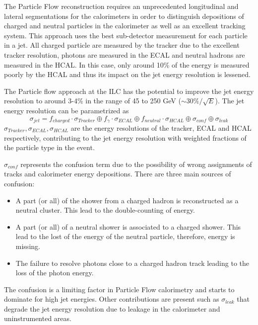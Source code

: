 The Particle Flow reconstruction requires an unprecedented longitudinal and lateral segmentations for the calorimeters in order to distinguish depositions of charged and neutral particles in the calorimeter as well as an excellent tracking system. This approach uses the best sub-detector measurement for each particle in a jet. All charged particle are measured by the tracker due to the excellent tracker resolution, photons are measured in the ECAL and neutral hadrons are measured in the HCAL. In this case, only around 10\% of the energy is measured poorly by the HCAL and thus its impact on the jet energy resolution is lessened.

The Particle flow approach at the ILC has the potential to improve the jet energy resolution to around 3-4\% in the range of 45 to 250 GeV ($\sim 30\%/\sqrt{E}$). The jet energy resolution can be parametrized as
\begin{equation}
  \sigma_{jet} = f_{charged} \cdot \sigma_{Tracker} \oplus f_{\gamma} \cdot \sigma_{ECAL} \oplus f_{neutral} \cdot \sigma_{HCAL} \oplus \sigma_{conf} \oplus \sigma_{leak}
\end{equation}
$\sigma_{Tracker}, \sigma_{ECAL}, \sigma_{HCAL}$ are the energy resolutions of the tracker, ECAL and HCAL respectively, contributing to the jet energy resolution with weighted fractions of the particle type in the event.

$\sigma_{conf}$ represents the confusion term due to the possibility of wrong assignments of tracks and calorimeter energy depositions. There are three main sources of confusion:

\begin{itemize}
  \item A part (or all) of the shower from a charged hadron is reconstructed as a neutral cluster. This lead to the double-counting of energy.
  \item A part (or all) of a neutral shower is associated to a charged shower. This lead to the lost of the energy of the neutral particle, therefore, energy is missing.
  \item The failure to resolve photons close to a charged hadron track leading to the loss of the photon energy.
\end{itemize}

The confusion is a limiting factor in Particle Flow calorimetry and starts to dominate for high jet energies. Other contributions are present such as $\sigma_{leak}$ that degrade the jet energy resolution due to leakage in the calorimeter and uninstrumented areas.

